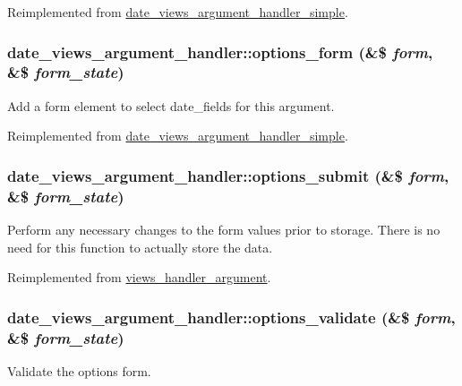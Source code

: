 Reimplemented from \hyperlink{classdate__views__argument__handler__simple_a346c709c51b14ccaaf186c3651eba925}{date\_\-views\_\-argument\_\-handler\_\-simple}.\hypertarget{classdate__views__argument__handler_a590b98bc076d465f778862b82c76f6e5}{
\subsubsection[{options\_\-form}]{\setlength{\rightskip}{0pt plus 5cm}date\_\-views\_\-argument\_\-handler::options\_\-form (\&\$ {\em form}, \/  \&\$ {\em form\_\-state})}}
\label{classdate__views__argument__handler_a590b98bc076d465f778862b82c76f6e5}
Add a form element to select date\_\-fields for this argument. 

Reimplemented from \hyperlink{classdate__views__argument__handler__simple_a5e0544a2cc996a45bca1ff1982da9fbc}{date\_\-views\_\-argument\_\-handler\_\-simple}.\hypertarget{classdate__views__argument__handler_ac9c3618a380bf3dadb6500c5e4a32cb5}{
\subsubsection[{options\_\-submit}]{\setlength{\rightskip}{0pt plus 5cm}date\_\-views\_\-argument\_\-handler::options\_\-submit (\&\$ {\em form}, \/  \&\$ {\em form\_\-state})}}
\label{classdate__views__argument__handler_ac9c3618a380bf3dadb6500c5e4a32cb5}
Perform any necessary changes to the form values prior to storage. There is no need for this function to actually store the data. 

Reimplemented from \hyperlink{classviews__handler__argument_ad9c8c040a47bd9910dbce31e8932b882}{views\_\-handler\_\-argument}.\hypertarget{classdate__views__argument__handler_ae970be5da3129fef9deaf4ccc2274e6c}{
\subsubsection[{options\_\-validate}]{\setlength{\rightskip}{0pt plus 5cm}date\_\-views\_\-argument\_\-handler::options\_\-validate (\&\$ {\em form}, \/  \&\$ {\em form\_\-state})}}
\label{classdate__views__argument__handler_ae970be5da3129fef9deaf4ccc2274e6c}
Validate the options form. 

